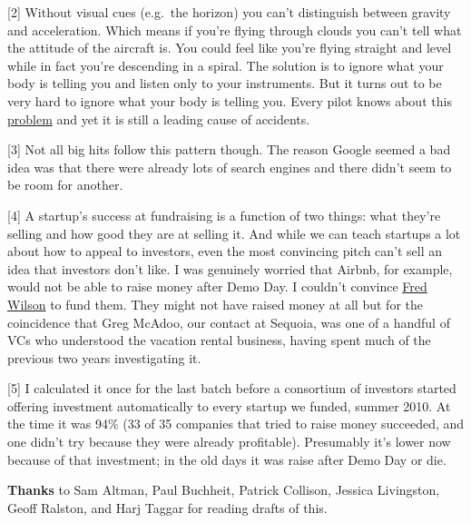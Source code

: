 {[}2{]} Without visual cues (e.g.~the horizon) you can't distinguish
between gravity and acceleration. Which means if you're flying through
clouds you can't tell what the attitude of the aircraft is. You could
feel like you're flying straight and level while in fact you're
descending in a spiral. The solution is to ignore what your body is
telling you and listen only to your instruments. But it turns out to be
very hard to ignore what your body is telling you. Every pilot knows
about this
\href{http://en.wikipedia.org/wiki/Spatial_disorientation}{problem} and
yet it is still a leading cause of accidents.

{[}3{]} Not all big hits follow this pattern though. The reason Google
seemed a bad idea was that there were already lots of search engines and
there didn't seem to be room for another.

{[}4{]} A startup's success at fundraising is a function of two things:
what they're selling and how good they are at selling it. And while we
can teach startups a lot about how to appeal to investors, even the most
convincing pitch can't sell an idea that investors don't like. I was
genuinely worried that Airbnb, for example, would not be able to raise
money after Demo Day. I couldn't convince \href{airbnb.html}{Fred
Wilson} to fund them. They might not have raised money at all but for
the coincidence that Greg McAdoo, our contact at Sequoia, was one of a
handful of VCs who understood the vacation rental business, having spent
much of the previous two years investigating it.

{[}5{]} I calculated it once for the last batch before a consortium of
investors started offering investment automatically to every startup we
funded, summer 2010. At the time it was 94\% (33 of 35 companies that
tried to raise money succeeded, and one didn't try because they were
already profitable). Presumably it's lower now because of that
investment; in the old days it was raise after Demo Day or die.

\textbf{Thanks} to Sam Altman, Paul Buchheit, Patrick Collison, Jessica
Livingston, Geoff Ralston, and Harj Taggar for reading drafts of this.
